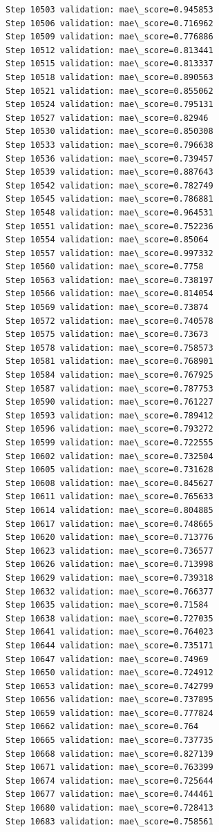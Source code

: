 \documentclass[11pt]{article}
\begin{document}
\begin{Verbatim}[commandchars=\\\{\}]
Step 10503 validation: mae\_score=0.945853
Step 10506 validation: mae\_score=0.716962
Step 10509 validation: mae\_score=0.776886
Step 10512 validation: mae\_score=0.813441
Step 10515 validation: mae\_score=0.813337
Step 10518 validation: mae\_score=0.890563
Step 10521 validation: mae\_score=0.855062
Step 10524 validation: mae\_score=0.795131
Step 10527 validation: mae\_score=0.82946
Step 10530 validation: mae\_score=0.850308
Step 10533 validation: mae\_score=0.796638
Step 10536 validation: mae\_score=0.739457
Step 10539 validation: mae\_score=0.887643
Step 10542 validation: mae\_score=0.782749
Step 10545 validation: mae\_score=0.786881
Step 10548 validation: mae\_score=0.964531
Step 10551 validation: mae\_score=0.752236
Step 10554 validation: mae\_score=0.85064
Step 10557 validation: mae\_score=0.997332
Step 10560 validation: mae\_score=0.7758
Step 10563 validation: mae\_score=0.738197
Step 10566 validation: mae\_score=0.814054
Step 10569 validation: mae\_score=0.73874
Step 10572 validation: mae\_score=0.740578
Step 10575 validation: mae\_score=0.73673
Step 10578 validation: mae\_score=0.758573
Step 10581 validation: mae\_score=0.768901
Step 10584 validation: mae\_score=0.767925
Step 10587 validation: mae\_score=0.787753
Step 10590 validation: mae\_score=0.761227
Step 10593 validation: mae\_score=0.789412
Step 10596 validation: mae\_score=0.793272
Step 10599 validation: mae\_score=0.722555
Step 10602 validation: mae\_score=0.732504
Step 10605 validation: mae\_score=0.731628
Step 10608 validation: mae\_score=0.845627
Step 10611 validation: mae\_score=0.765633
Step 10614 validation: mae\_score=0.804885
Step 10617 validation: mae\_score=0.748665
Step 10620 validation: mae\_score=0.713776
Step 10623 validation: mae\_score=0.736577
Step 10626 validation: mae\_score=0.713998
Step 10629 validation: mae\_score=0.739318
Step 10632 validation: mae\_score=0.766377
Step 10635 validation: mae\_score=0.71584
Step 10638 validation: mae\_score=0.727035
Step 10641 validation: mae\_score=0.764023
Step 10644 validation: mae\_score=0.735171
Step 10647 validation: mae\_score=0.74969
Step 10650 validation: mae\_score=0.724912
Step 10653 validation: mae\_score=0.742799
Step 10656 validation: mae\_score=0.737895
Step 10659 validation: mae\_score=0.777824
Step 10662 validation: mae\_score=0.764
Step 10665 validation: mae\_score=0.737735
Step 10668 validation: mae\_score=0.827139
Step 10671 validation: mae\_score=0.763399
Step 10674 validation: mae\_score=0.725644
Step 10677 validation: mae\_score=0.744461
Step 10680 validation: mae\_score=0.728413
Step 10683 validation: mae\_score=0.758561

\end{Verbatim}
\end{document}
